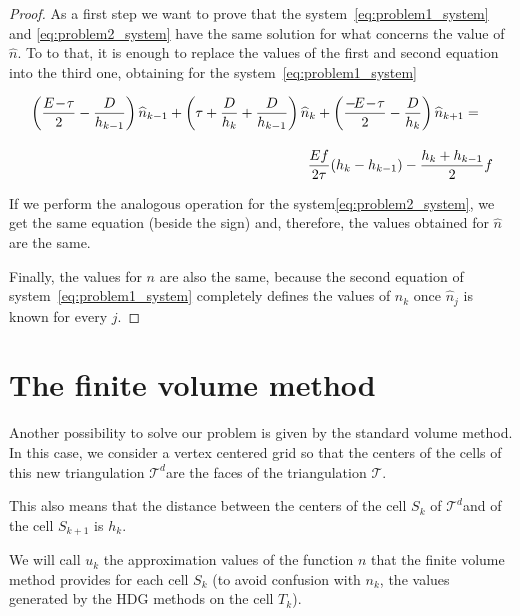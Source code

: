 \documentclass[a4paper,11pt, draft]{article}
\newcommand{\dualt}{\ensuremath{\mathcal{T}^d}}
\begin{document}
\begin{proof}
As a first step we want to prove that the system~\ref{eq:problem1_system} and 
\ref{eq:problem2_system} have the same solution for what concerns the value of $\widehat{n}$. To to 
that, it is enough to replace the values of the first and second equation into the third one, 
obtaining for the system~\ref{eq:problem1_system}

\begin{equation}\label{eq:hdg_condensed_system}
\begin{multlined}[b][.80\textwidth]
 \left(\frac{E \! - \! \tau}{2} - \frac{D}{h_{k - 1}}\right)\widehat{n}_{k - 1} + \left(\tau + 
\frac{D}{h_{k}} + \frac{D}{h_{k - 1}}\right) \widehat{n}_{k} + \left(\frac{-\!E \! - \! 
\tau}{2} - \frac{D}{h_{k}} \right) \widehat{n}_{k + 1} = \\[10pt]
 \frac{Ef}{2\tau}(h_{k} - h_{k - 1}) - \frac{h_{k} + h_{k-1}}{2}f
\end{multlined}
\end{equation}

If we perform the analogous operation for the system\ref{eq:problem2_system}, we get the same 
equation (beside the sign) and, therefore, the values obtained for $\widehat{n}$ are the same. 

Finally, the values for $n$ are also the same, because the second equation of 
system~\ref{eq:problem1_system} completely defines the values of $n_k$ once $\widehat{n}_{j}$ is 
known for every $j$.
\end{proof}

\section{The finite volume method}
Another possibility to solve our problem is given by the standard volume method. In this case, we 
consider a vertex centered grid so that the centers of the cells of this new triangulation 
\dualt are the faces of the triangulation $\mathcal{T}$.

This also means that the distance between the centers of the cell $S_k$ of \dualt and of the cell 
$S_{k+1}$ is $h_{k}$.

We will call $u_k$ the approximation values of the function $n$ that the 
finite volume method provides for each cell $S_k$ (to avoid confusion with $n_k$, the values 
generated by the HDG methods on the cell $T_k$).
\end{document}
